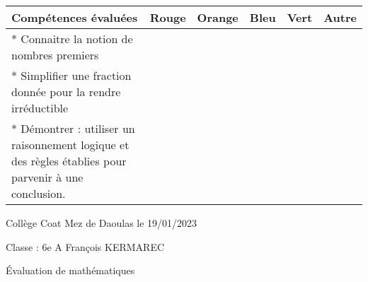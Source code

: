 \documentclass[a4paper,12pt,fleqn]{article}
\begin{document}
\begin{footnotesize}

\begin{center}

\begin{tabular}{|p{120mm}|p{8mm}|p{10mm}|p{8mm}|p{8mm}|p{8mm}|}

\hline
\textbf{Compétences évaluées} & \textbf{Rouge} & \textbf{Orange} & \textbf{Bleu} & \textbf{Vert} & \textbf{Autre} \\
\hline


*  Connaitre la notion de nombres premiers  & & & & & \\ 
\hline
*  Simplifier une fraction donnée pour la rendre irréductible  & & & & & \\ 
\hline
*  Démontrer : utiliser un raisonnement logique et des règles établies pour parvenir à une conclusion.  & & & & & \\ 
\hline
\end{tabular}
\end{center}
\end{footnotesize}
 \par 
\medskip
 \par 
\medskip
 \par 
\medskip
\newpage
\setcounter{exo}{0}


Collège Coat Mez de Daoulas  \hfill  le 19/01/2023

Classe : 6e A \hfill François KERMAREC

\begin{center}
\begin{LARGE} Évaluation de mathématiques \end{LARGE}
\end{center}

\end{document}
